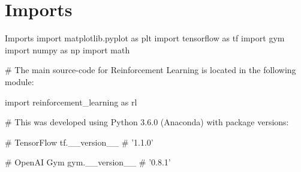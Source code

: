 \documentclass{article}
\providecommand{\tightlist}{%
	\setlength{\itemsep}{0pt}\setlength{\parskip}{0pt}}
\begin{document}
%
%
%

\section{Imports}\label{imports}

\begin{langPyOne}{Imports}
import matplotlib.pyplot as plt
import tensorflow as tf
import gym
import numpy as np
import math

# The main source-code for Reinforcement Learning is located in the following module:

import reinforcement_learning as rl

# This was developed using Python 3.6.0 (Anaconda) with package versions:

# TensorFlow
tf.__version__
# '1.1.0'

# OpenAI Gym
gym.__version__
# '0.8.1'
\end{langPyOne}
\end{document}
